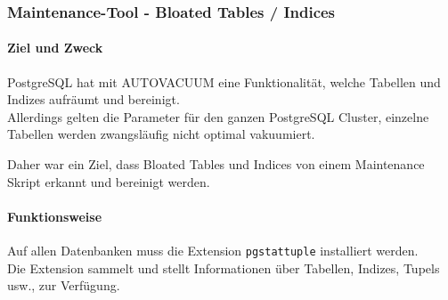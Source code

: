
\begin{flushleft}
    \subsubsection{Maintenance-Tool - Bloated Tables / Indices}
    \paragraph{Ziel und Zweck}
    \Gls{PostgreSQL} hat mit \Gls{AUTOVACUUM} eine Funktionalität, welche Tabellen und Indizes aufräumt und bereinigt.\\
    Allerdings gelten die Parameter für den ganzen \Gls{PostgreSQL Cluster}, einzelne Tabellen werden zwangsläufig nicht optimal vakuumiert.\\
\end{flushleft}
\begin{flushleft}
    Daher war ein Ziel, dass Bloated Tables und Indices von einem Maintenance Skript erkannt und bereinigt werden.
\end{flushleft}
\begin{flushleft}
    \paragraph{Funktionsweise}
    Auf allen Datenbanken muss die Extension \texttt{pgstattuple} installiert werden.\\
    Die Extension sammelt und stellt Informationen über Tabellen, Indizes, Tupels usw., zur Verfügung.
\end{flushleft}
